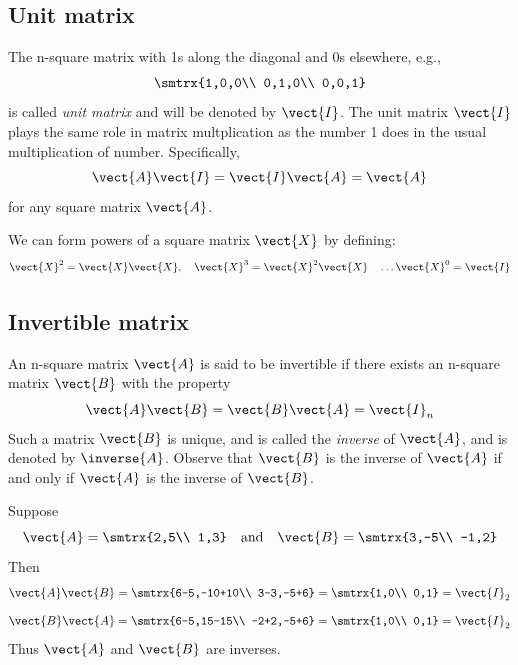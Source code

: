 \subsection{Unit matrix}
The n-square matrix with 1s along the diagonal and 0s elsewhere, e.g., \[ \smtrx{1,0,0\\ 0,1,0\\ 0,0,1} \] is called \emph{unit matrix} and will be denoted by $\vect{I}$. The unit matrix $\vect{I}$ plays the same role in matrix multplication as the number 1 does in the usual multiplication of number. Specifically, \[ \vect{A}\vect{I}=\vect{I}\vect{A}=\vect{A} \] for any square matrix $\vect{A}$.\par 
We can form powers of a square matrix $\vect{X}$ by defining:\[ \vect{X}^2=\vect{X}\vect{X}, \quad \vect{X}^3=\vect{X}^2 \vect{X} \quad \ldots \vect{X}^0=\vect{I} \]
\subsection{Invertible matrix}
An n-square matrix $\vect{A}$ is said to be invertible if there exists an n-square matrix $\vect{B}$ with the property \[ \vect{A}\vect{B}=\vect{B}\vect{A}=\vect{I}_n \] Such a matrix $\vect{B}$ is unique, and is called the \emph{inverse} of $\vect{A}$, and is denoted by $\inverse{A}$. Observe that $\vect{B}$ is the inverse of $\vect{A}$ if and only if $\vect{A}$ is the inverse of $\vect{B}$.
\begin{example}
Suppose \[ \vect{A}=\smtrx{2,5\\ 1,3} \quad \text{and} \quad \vect{B}=\smtrx{3,-5\\ -1,2} \] Then \[ \vect{A}\vect{B}=\smtrx{6-5,-10+10\\ 3-3,-5+6}=\smtrx{1,0\\ 0,1}=\vect{I}_2 \]
\[ \vect{B}\vect{A}=\smtrx{6-5,15-15\\ -2+2,-5+6}=\smtrx{1,0\\ 0,1}=\vect{I}_2 \] Thus $\vect{A}$ and $\vect{B}$ are inverses.
\end{example}
